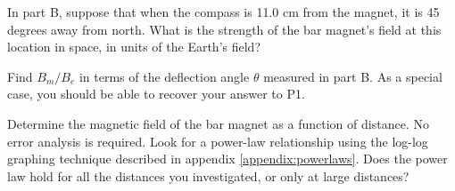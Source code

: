 \prelab

\prelabquestion  In part B, suppose that
when the compass is 11.0 cm from the magnet, it is
45 degrees away from north. What is
the strength of the bar magnet's field at this location in space,
in units of the Earth's field?

\prelabquestion Find $B_m/B_e$ in terms of the deflection angle $\theta$ measured in part B. As a special
case, you should be able to recover your answer to P1.

\analysis

Determine the magnetic
field of the bar magnet as a function of distance. No error analysis is required. 
Look for a power-law relationship using the log-log graphing technique described in 
appendix \ref{appendix:powerlaws}. Does the power law hold for
all the distances you investigated, or only at large distances?
